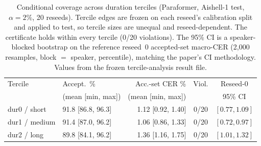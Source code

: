 \documentclass[11pt]{article}
\begin{document}
\begin{table}[t]
  \centering
  \caption{Conditional coverage across duration terciles (Paraformer, Aishell-1 test,
  $\alpha=2\%$, 20 reseeds). Tercile edges are frozen on each reseed's calibration split and
  applied to test, so tercile sizes are unequal and reseed-dependent. The certificate holds
  within every tercile (0/20 violations). The 95\% CI is a speaker-blocked bootstrap on the
  reference reseed~0 accepted-set macro-CER (2{,}000 resamples, block $=$ speaker, percentile),
  matching the paper's CI methodology. Values from the frozen tercile-analysis
  result file.}
  \label{tab:mondrian}
  \small
  \setlength{\tabcolsep}{4.5pt}
  \begin{tabular}{llrcc}
    \toprule
    Tercile & Accept.\ \% & Acc.-set CER \% & Viol. & Reseed-0 \\
     & (mean [min, max]) & (mean [min, max]) & & 95\% CI \\
    \midrule
    dur0 / short  & 91.8 [86.8, 96.3] & 1.12 [0.92, 1.40] & 0/20 & $[0.77, 1.09]$ \\
    dur1 / medium & 91.4 [87.0, 96.2] & 1.06 [0.86, 1.33] & 0/20 & $[0.72, 0.97]$ \\
    dur2 / long   & 89.8 [84.1, 96.2] & 1.36 [1.16, 1.75] & 0/20 & $[1.01, 1.32]$ \\
    \bottomrule
  \end{tabular}
\end{table}
\end{document}
